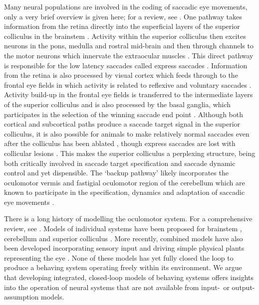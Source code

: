 Many neural populations are involved in the coding of saccadic eye
movements, only a very brief overview is given here; for a
review, see \cite{munoz_commentary:_2002}. One pathway takes
information from the retina directly into the superficial layers of
the superior colliculus in the brainstem
\citep{sterling_receptive_1971,linden_massive_1983,wu_involvement_1994}.
Activity within
the superior colliculus then excites neurons in the pons, medulla and
rostral mid-brain \citep{sparks_brainstem_2002} and then through
channels to the motor neurons which innervate the extraocular muscles
\citep{fuchs_firing_1970,sparks_brainstem_2002}. This direct pathway
is responsible for the low latency saccades called express saccades
\citep{schiller_effect_1987,edelman_activity_1996}.
Information from the retina is also processed by visual cortex which
feeds through to the frontal eye fields in which activity is related
to reflexive and voluntary
saccades \citep{schall_neural_1999}. Activity build-up in the frontal
eye fields is transferred to the intermediate layers of the superior
colliculus
\citep{stanton_frontal_1988-1} and is also processed by the basal ganglia,
which participates in the selection of the winning saccade end point
\citep{stanton_frontal_1988}.
Although both cortical and subcortical paths produce a saccade
target signal in the superior colliculus, it is also possible for
animals to make relatively normal saccades even after the
colliculus has been ablated
\citep{wurtz_activity_1972,aizawa_reversible_1998},
though express saccades are lost with collicular lesions
\citep{schiller_effect_1987}. This makes the superior colliculus
a perplexing structure, being both critically involved in saccade
target specification \citep{sparks_sensory_1987} and saccade dynamic control
\citep{waitzman_superior_1991,goossens_optimal_2012} and yet dispensible.
The `backup pathway' likely incorporates the oculomotor vermis and
fastigial oculomotor region of the
cerebellum which are known to participate in the specification, dynamics
and adaptation of saccadic eye movements
\citep{kleine_saccade-related_2003,takagi_effects_1998}.

There is a long history of modelling the oculomotor system. For a comprehensive
review, see \cite{girard_brainstem_2005}. Models of individual systems have been proposed for brainstem \citep{robinson_oculomotor_1975,scudder_new_1988,gancarz_neural_1998},
cerebellum \citep{quaia_model_1999,dean_modelling_1995,dean_learning_1994} and
superior colliculus
\citep{arai_two-dimensional_1994,moren_mechanism_2013,marino_spatial_2012}.
More recently, combined models have also been
developed incorporating sensory input \citep{cope_basal_2017} and driving simple
physical plants representing the eye \citep{tabareau_geometry_2007,nguyen_saccade_2014,thurat_biomimetic_2015}.
None of these models has yet fully closed the loop to produce a behaving system
operating freely within its environment. We argue that developing
integrated, closed-loop models of behaving systems offers insights into
the operation of neural systems that are not available from
input-~or output-assumption models.


